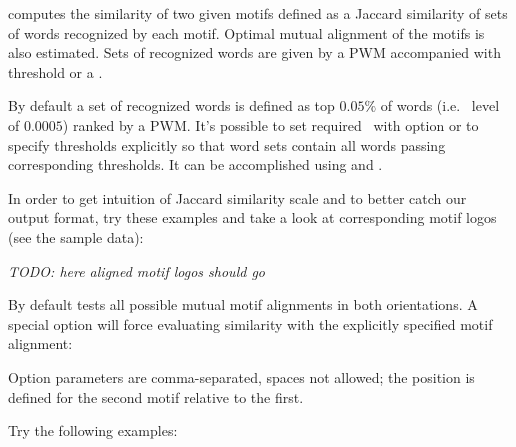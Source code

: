  computes the similarity of two given motifs defined as a Jaccard similarity of sets of words recognized by each motif.
Optimal mutual alignment of the motifs is also estimated. Sets of recognized words are given by a PWM accompanied with threshold or a \pvalue. 

By default a set of recognized words is defined as top $0.05\%$ of words (i.e. \pvalue\ level of $0.0005$) ranked by a PWM.
It's possible to set required \pvalue\ with  option or to specify thresholds explicitly so that word sets contain all words passing corresponding thresholds. It can be accomplished using  and .

In order to get intuition of Jaccard similarity scale and to better catch our output format, try these examples and take a look at corresponding motif logos (see the sample data):

\emph{TODO: here aligned motif logos should go}





By default  tests all possible mutual motif alignments in both orientations. 
A special option  will force evaluating similarity with the explicitly specified motif alignment:


Option parameters are comma-separated, spaces not allowed; the position is defined for the second motif relative to the first.

Try the following examples:

